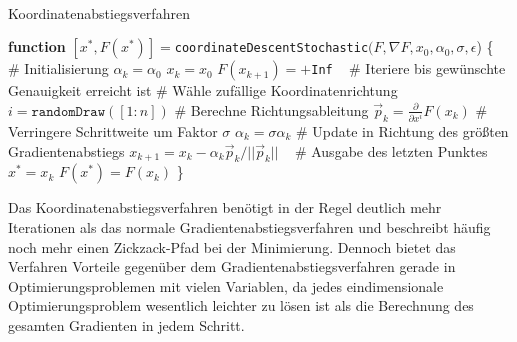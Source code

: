~\\
\begin{algorithm}{Koordinatenabstiegsverfahren}{}
\label{alg:coordinate_descent_stochastic}
\begin{algorithmic}
\STATE \textbf{function} $[x^*, F(x^*)]= $\texttt{coordinateDescentStochastic}$(F,\nabla F, x_0, \alpha_0, \sigma, \epsilon$) \{
\STATE ~
\STATE \# Initialisierung
\STATE $\alpha_k = \alpha_0$
\STATE $x_k = x_0$
\STATE $F(x_{k+1}) = +$\texttt{Inf}
\STATE ~
\STATE \# Iteriere bis gewünschte Genauigkeit erreicht ist
\STATE \# Wähle zufällige Koordinatenrichtung
\STATE $i = \texttt{randomDraw}([1:n])$
\STATE \# Berechne Richtungsableitung
\STATE $\vec{p}_k = \frac{\partial}{\partial x^i}F(x_k)$
\STATE \# Verringere Schrittweite um Faktor $\sigma$
\STATE $\alpha_k = \sigma\alpha_k$
\ENDWHILE
\STATE \# Update in Richtung des größten Gradientenabstiegs
\STATE $x_{k+1} = x_k - \alpha_k \vec{p}_k / ||\vec{p}_k|| $
\ENDWHILE
\STATE ~
\STATE \# Ausgabe des letzten Punktes
\STATE $x^* = x_k$
\STATE $F(x^*) = F(x_k)$
\STATE \}
\end{algorithmic}
\end{algorithm}


Das Koordinatenabstiegsverfahren benötigt in der Regel deutlich mehr Iterationen als das normale Gradientenabstiegsverfahren und beschreibt häufig noch mehr einen Zickzack-Pfad bei der Minimierung.%
Dennoch bietet das Verfahren Vorteile gegenüber dem Gradientenabstiegsverfahren gerade in Optimierungsproblemen mit vielen Variablen, da jedes eindimensionale Optimierungsproblem wesentlich leichter zu lösen ist als die Berechnung des gesamten Gradienten in jedem Schritt. 

